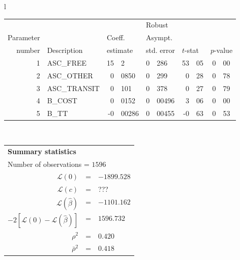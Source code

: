   \begin{tabular}{l}
\begin{tabular}{rlr@{.}lr@{.}lr@{.}lr@{.}l}
         &                       &   \multicolumn{2}{l}{}    & \multicolumn{2}{l}{Robust}  &     \multicolumn{4}{l}{}   \\
Parameter &                       &   \multicolumn{2}{l}{Coeff.}      & \multicolumn{2}{l}{Asympt.}  &     \multicolumn{4}{l}{}   \\
number &  Description                     &   \multicolumn{2}{l}{estimate}      & \multicolumn{2}{l}{std. error}  &   \multicolumn{2}{l}{$t$-stat}  &   \multicolumn{2}{l}{$p$-value}   \\

\hline

1 & ASC\_FREE & 15&2 & 0&286 & 53&05 & 0&00 \\
2 & ASC\_OTHER & 0&0850 & 0&299 & 0&28 & 0&78 \\
3 & ASC\_TRANSIT & 0&101 & 0&378 & 0&27 & 0&79 \\
4 & B\_COST & 0&0152 & 0&00496 & 3&06 & 0&00 \\
5 & B\_TT & -0&00286 & 0&00455 & -0&63 & 0&53 \\
\hline

\end{tabular}
\\
\begin{tabular}{rcl}
\multicolumn{3}{l}{\bf Summary statistics}\\
\multicolumn{3}{l}{ Number of observations = $1596$} \\
 $\mathcal{L}(0)$ &=&  $-1899.528$ \\
 $\mathcal{L}(c)$ &=& ???\\
 $\mathcal{L}(\hat{\beta})$ &=& $-1101.162 $  \\
 $-2[\mathcal{L}(0) -\mathcal{L}(\hat{\beta})]$ &=& $1596.732$ \\
    $\rho^2$ &=&   $0.420$ \\
    $\bar{\rho}^2$ &=&    $0.418$ \\
\end{tabular}
\end{tabular}

